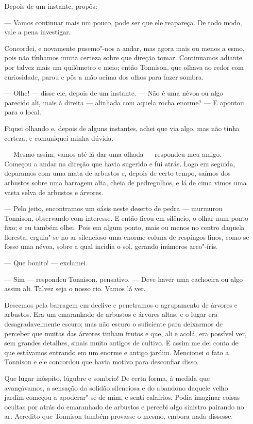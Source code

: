 Depois de um instante, propôs:

--- Vamos continuar mais um pouco, pode ser que ele reapareça. De todo modo, vale a pena investigar.

Concordei, e novamente pusemo"-nos a andar, mas agora mais ou menos a esmo, pois não tínhamos muita certeza sobre que
direção tomar. Continuamos adiante por talvez mais um quilômetro e meio; então Tonnison, que olhava ao redor com
curiosidade, parou e pôs a mão acima dos olhos para fazer sombra.

--- Olhe! --- disse ele, depois de um instante. --- Não é uma névoa ou algo parecido ali, mais à direita --- alinhada com aquela
rocha enorme? --- E apontou para o local.

Fiquei olhando e, depois de alguns instantes, achei que via algo, mas não tinha certeza, e comuniquei minha dúvida.

--- Mesmo assim, vamos até lá dar uma olhada --- respondeu meu amigo. Começou a andar na direção que havia sugerido e fui
atrás. Logo em seguida, deparamos com uma mata de arbustos e, depois de certo tempo, saímos dos arbustos sobre uma
barragem alta, cheia de pedregulhos, e lá de cima vimos uma vasta selva de arbustos e árvores.

--- Pelo jeito, encontramos um oásis neste deserto de pedra --- murmurou Tonnison, observando com interesse. E então ficou em
silêncio, o olhar num ponto fixo; e eu também olhei. Pois em algum ponto, mais ou menos no centro daquela floresta,
erguia"-se no ar silencioso uma enorme coluna de respingos finos, como se fosse uma névoa, sobre a qual incidia o sol,
gerando inúmeros arco"-íris.

--- Que bonito! --- exclamei.

--- Sim --- respondeu Tonnison, pensativo. --- Deve haver uma cachoeira ou algo assim ali. Talvez seja o nosso
rio. Vamos lá ver.

Descemos pela barragem em declive e penetramos o agrupamento de árvores e arbustos. Era um emaranhado de arbustos e
árvores altas, e o lugar era desagradavelmente escuro; mas não escuro o suficiente para deixarmos de perceber que
muitas das árvores tinham frutos e que, ali e acolá, era possível ver, sem grandes detalhes, sinais muito antigos de
cultivo. E assim me dei conta de que estávamos entrando em um enorme e antigo jardim. Mencionei o fato a Tonnison e ele
concordou que havia motivo para desconfiar disso.

Que lugar inóspito, lúgubre e sombrio! De certa forma, à medida que avançávamos, a sensação da solidão silenciosa e do
abandono daquele velho jardim começou a apoderar"-se de mim, e senti calafrios. Podia imaginar coisas ocultas por atrás
do emaranhado de arbustos e percebi algo sinistro pairando no ar. Acredito que Tonnison também provasse o mesmo, embora
nada dissesse.

